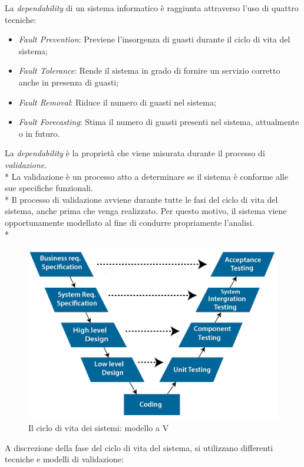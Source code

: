 La \emph{dependability} di un sistema informatico \`e raggiunta attraverso l'uso di quattro tecniche:
\begin{itemize}
	\item \emph{Fault Prevention}: Previene l'insorgenza di guasti durante il ciclo di vita del sistema;
	\item \emph{Fault Tolerance}: Rende il sistema in grado di fornire un servizio corretto anche in presenza di guasti;
	\item \emph{Fault Removal}: Riduce il numero di guasti nel sistema;
	\item \emph{Fault Forecasting}: Stima il numero di guasti presenti nel sistema, attualmente o in futuro.
\end{itemize}
La \emph{dependability} \`e la propriet\`a che viene misurata durante il processo di \emph{validazione}.\\*
La validazione \`e un processo atto a determinare se il sistema \`e conforme alle sue specifiche funzionali.\\*
Il processo di validazione avviene durante tutte le fasi del ciclo di vita del sistema, anche prima che venga realizzato. Per questo motivo, il sistema viene opportunamente modellato al fine di condurre propriamente l'analisi.\\*
\begin{figure}[h]
	\centering
	\includegraphics[width=0.7\linewidth]{img/vmodel}
	\caption{Il ciclo di vita dei sistemi: modello a V}
	\label{fig:vmodel}
\end{figure}
\noindent{}A discrezione della fase del ciclo di vita del sistema, si utilizzano differenti tecniche e modelli di validazione: \cite{librobonda}
